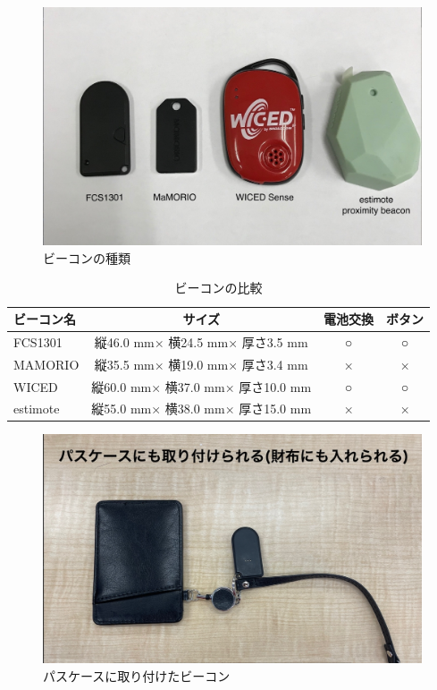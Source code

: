 \begin{figure}[H]
  \begin{center}
    \includegraphics[width=150mm]{image/beaconType.jpg}
    \caption{ビーコンの種類}
    \label{fig:beacons}
  \end{center}
\end{figure}

\begin{table}[H]
  \begin{center}
    \caption{ビーコンの比較}
    \label{tb:beacons}
    \begin{tabular}{|l|c|c|c|} \hline
      ビーコン名 & サイズ                            & 電池交換 & ボタン \\ \hline \hline
      FCS1301    & 縦46.0 mm× 横24.5 mm× 厚さ3.5 mm  & ○        & ○      \\
      MAMORIO    & 縦35.5 mm× 横19.0 mm× 厚さ3.4 mm  & ×        & ×      \\
      WICED      & 縦60.0 mm× 横37.0 mm× 厚さ10.0 mm & ○        & ○      \\
      estimote   & 縦55.0 mm× 横38.0 mm× 厚さ15.0 mm & ×        & ×      \\\hline
    \end{tabular}
  \end{center}
\end{table}

\begin{figure}[H]
  \begin{center}
    \includegraphics[width=150mm]{image/beaconForpass.jpg}
    \caption{パスケースに取り付けたビーコン}
    \label{fig:beaconforpass}
  \end{center}
\end{figure}

